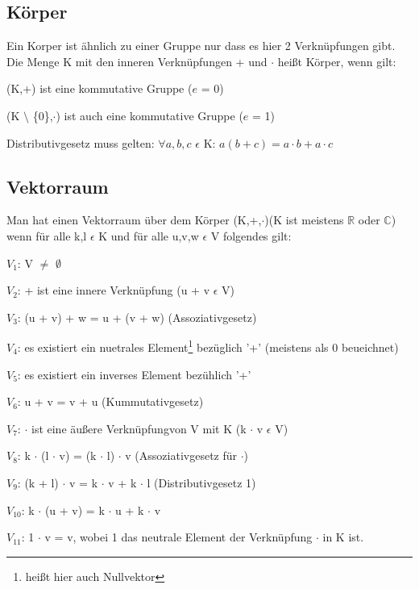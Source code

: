 \documentclass[a4paper,10pt]{scrartcl}
\begin{document}
        \subsection{Körper}
            Ein Korper ist ähnlich zu einer Gruppe nur dass es hier 2 Verknüpfungen gibt. Die Menge K mit den inneren Verknüpfungen + und $\cdot$ heißt Körper, wenn gilt:
            \begin{description}
                \item (K,+) ist eine kommutative Gruppe ($e$ = 0)
                \item (K $\setminus$ \{0\},$\cdot$) ist auch eine kommutative Gruppe ($e$ = 1)
                \item Distributivgesetz muss gelten: $\forall a,b,c$ $\epsilon$ K: $a(b + c) = a \cdot b + a \cdot c$
            \end{description}
            \newpage
        \subsection{Vektorraum}
            Man hat einen Vektorraum über dem Körper (K,+,$\cdot$)(K ist meistens $\mathbb{R}$ oder $\mathbb{C}$) 
            wenn für alle k,l $\epsilon$ K und für alle u,v,w $\epsilon$ V folgendes gilt:
            \begin{description}
                \item $V_1$: V $\neq$ $\emptyset$
                \item $V_2$: + ist eine innere Verknüpfung (u + v  $\epsilon$ V)
                \item $V_3$: (u + v) + w = u + (v + w) (Assoziativgesetz)
                \item $V_4$: es existiert ein nuetrales Element\footnote{heißt hier auch Nullvektor} bezüglich '+' (meistens als 0 beueichnet)
                \item $V_5$: es existiert ein inverses Element bezühlich '+' 
                \item $V_6$: u + v = v + u (Kummutativgesetz)
                \item $V_7$: $\cdot$ ist eine äußere Verknüpfungvon V mit K (k $\cdot$ v $\epsilon$ V)
                \item $V_8$: k $\cdot$ (l $\cdot$ v) = (k $\cdot$ l) $\cdot$ v (Assoziativgesetz für $\cdot$)
                \item $V_9$: (k + l) $\cdot$ v = k $\cdot$ v + k $\cdot$ l (Distributivgesetz 1)
                \item $V_{10}$: k $\cdot$ (u + v) = k $\cdot$ u + k $\cdot$ v
                \item $V_{11}$: 1 $\cdot$ v = v, wobei 1 das neutrale Element der Verknüpfung $\cdot$ in K ist.
            \end{description} 
\end{document}
